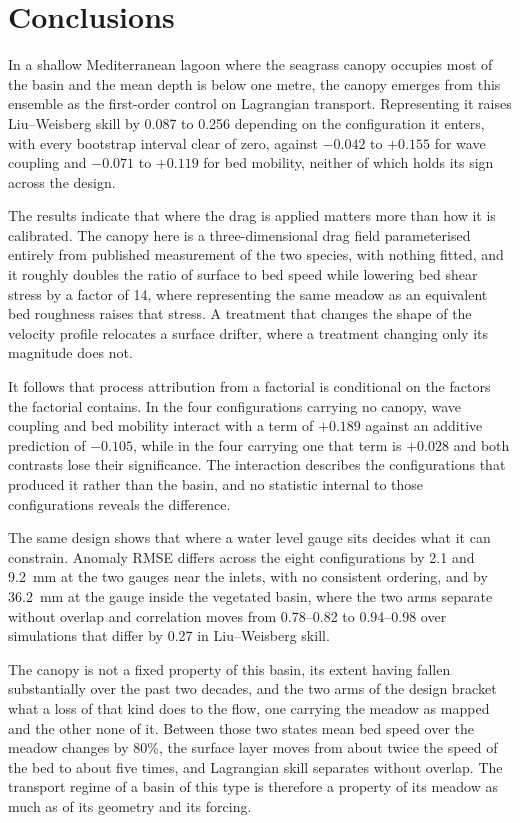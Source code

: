 \section{Conclusions}
\label{sec:conclusions}

In a shallow Mediterranean lagoon where the seagrass canopy occupies most of the
basin and the mean depth is below one metre, the canopy emerges from this
ensemble as the first-order control on Lagrangian transport. Representing it
raises Liu--Weisberg skill by 0.087 to 0.256 depending on the configuration it
enters, with every bootstrap interval clear of zero, against $-0.042$ to
$+0.155$ for wave coupling and $-0.071$ to $+0.119$ for bed mobility, neither of
which holds its sign across the design.

The results indicate that where the drag is applied matters more than how it is
calibrated. The canopy here is a three-dimensional drag field parameterised
entirely from published measurement of the two species, with nothing fitted, and
it roughly doubles the ratio of surface to bed speed while lowering bed shear
stress by a factor of 14, where representing the same meadow as an equivalent
bed roughness raises that stress. A treatment that changes the shape of the
velocity profile relocates a surface drifter, where a treatment changing only
its magnitude does not.

It follows that process attribution from a factorial is conditional on the
factors the factorial contains. In the four configurations carrying no canopy,
wave coupling and bed mobility interact with a term of $+0.189$ against an
additive prediction of $-0.105$, while in the four carrying one that term is
$+0.028$ and both contrasts lose their significance. The interaction describes
the configurations that produced it rather than the basin, and no statistic
internal to those configurations reveals the difference.

The same design shows that where a water level gauge sits decides what it can
constrain. Anomaly RMSE differs across the eight configurations by 2.1 and
9.2~mm at the two gauges near the inlets, with no consistent ordering, and by
36.2~mm at the gauge inside the vegetated basin, where the two arms separate
without overlap and correlation moves from 0.78--0.82 to 0.94--0.98 over
simulations that differ by 0.27 in Liu--Weisberg skill.

The canopy is not a fixed property of this basin, its extent having fallen
substantially over the past two decades, and the two arms of the design bracket
what a loss of that kind does to the flow, one carrying the meadow as mapped and
the other none of it. Between those two states mean bed speed over the meadow
changes by 80\%, the surface layer moves from about twice the speed of the bed
to about five times, and Lagrangian skill separates without overlap. The
transport regime of a basin of this type is therefore a property of its meadow
as much as of its geometry and its forcing.
